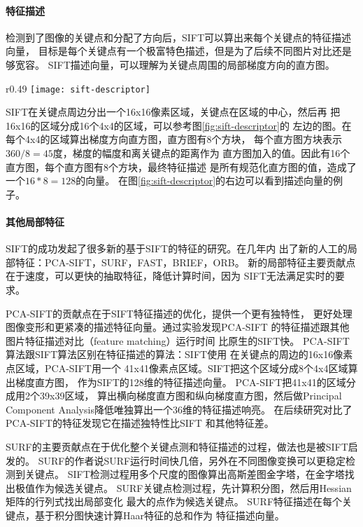 \paragraph*{特征描述}
检测到了图像的关键点和分配了方向后，SIFT可以算出来每个关键点的特征描述向量，
目标是每个关键点有一个极富特色描述，但是为了后续不同图片对比还是够宽容。
SIFT描述向量，可以理解为关键点周围的局部梯度方向的直方图。

\begin{wrapfigure}{r}{0.49\textwidth}
  \centering
    \texttt{[image: sift-descriptor]}
    \caption{SIFT特征描述。源：Cornell CS664}
  \label{fig:sift-descriptor}
\end{wrapfigure}
SIFT在关键点周边分出一个16x16像素区域，关键点在区域的中心，然后再
把16x16的区域分成16个4x4的区域，可以参考图\ref{fig:sift-descriptor}的
左边的图。在每个4x4的区域算出梯度方向直方图，直方图有8个方块，
每个直方图方块表示$360 / 8 = 45$度，梯度的幅度和离关键点的距离作为
直方图加入的值。因此有16个直方图，每个直方图有8个方块，最终特征描述
是所有规范化直方图的值，造成了一个$16 * 8 = 128$的向量。
在图\ref{fig:sift-descriptor}的右边可以看到描述向量的例子。


\paragraph{其他局部特征}
SIFT的成功发起了很多新的基于SIFT的特征的研究。在几年内
出了新的人工的局部特征：PCA-SIFT，SURF，FAST，BRIEF，ORB。
\cite{ke2004pca, bay2006surf, fast2006machine, calonder2010brief, rublee2011orb}
新的局部特征主要贡献点在于速度，可以更快的抽取特征，降低计算时间，因为
SIFT无法满足实时的要求。\cite{juan2009comparison, calonder2010brief}

PCA-SIFT的贡献点在于SIFT特征描述的优化，提供一个更有独特性，
更好处理图像变形和更紧凑的描述特征向量。通过实验发现PCA-SIFT
的特征描述跟其他图片特征描述对比（feature matching）运行时间
比原生的SIFT快。\cite{ke2004pca}
PCA-SIFT算法跟SIFT算法区别在特征描述的算法：SIFT使用
在关键点的周边的16x16像素点区域，PCA-SIFT用一个
41x41像素点区域。SIFT把这个区域分成8个4x4区域算出梯度直方图，
作为SIFT的128维的特征描述向量。
PCA-SIFT把41x41的区域分成用2个39x39区域，
算出横向梯度直方图和纵向梯度直方图，然后做Principal Component
Analysis降低唯独算出一个36维的特征描述响亮。
在后续研究对比了PCA-SIFT的特征发现它在描述独特性比SIFT
和其他特征差。\cite{mikolajczyk2005performance}

SURF的主要贡献点在于优化整个关键点测和特征描述的过程，做法也是被SIFT启发的。
SURF的作者说SURF运行时间快几倍，另外在不同图像变换可以更稳定检测到关键点。\cite{bay2006surf}
SIFT检测过程用多个尺度的图像算出高斯差图金字塔，在金字塔找出极值作为候选关键点。
SURF关键点检测过程，先计算积分图，然后用Hessian矩阵的行列式找出局部变化
最大的点作为候选关键点。
SURF特征描述在每个关键点，基于积分图快速计算Haar特征的总和作为
特征描述向量。

